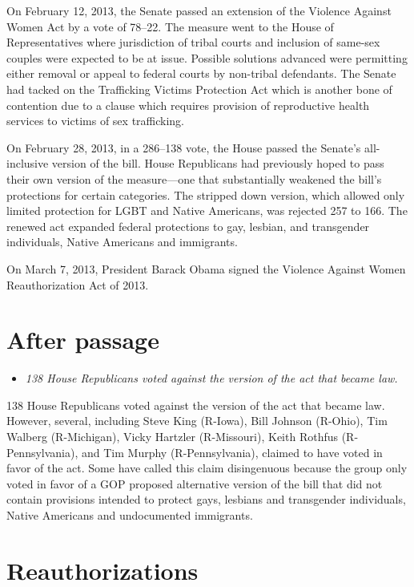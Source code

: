 On February 12, 2013, the Senate passed an extension of the Violence
Against Women Act by a vote of 78--22. The measure went to the House of
Representatives where jurisdiction of tribal courts and inclusion of
same-sex couples were expected to be at issue. Possible solutions
advanced were permitting either removal or appeal to federal courts by
non-tribal defendants. The Senate had tacked on the Trafficking Victims
Protection Act which is another bone of contention due to a clause which
requires provision of reproductive health services to victims of sex
trafficking.

On February 28, 2013, in a 286--138 vote, the House passed the Senate's
all-inclusive version of the bill. House Republicans had previously
hoped to pass their own version of the measure---one that substantially
weakened the bill's protections for certain categories. The stripped
down version, which allowed only limited protection for LGBT and Native
Americans, was rejected 257 to 166. The renewed act expanded federal
protections to gay, lesbian, and transgender individuals, Native
Americans and immigrants.

On March 7, 2013, President Barack Obama signed the Violence Against
Women Reauthorization Act of 2013.

\section{After passage}\label{after-passage}

\begin{itemize}
\item
  \emph{138 House Republicans voted against the version of the act that
  became law.}
\end{itemize}

138 House Republicans voted against the version of the act that became
law. However, several, including Steve King (R-Iowa), Bill Johnson
(R-Ohio), Tim Walberg (R-Michigan), Vicky Hartzler (R-Missouri), Keith
Rothfus (R-Pennsylvania), and Tim Murphy (R-Pennsylvania), claimed to
have voted in favor of the act. Some have called this claim disingenuous
because the group only voted in favor of a GOP proposed alternative
version of the bill that did not contain provisions intended to protect
gays, lesbians and transgender individuals, Native Americans and
undocumented immigrants.

\section{Reauthorizations}\label{reauthorizations}

